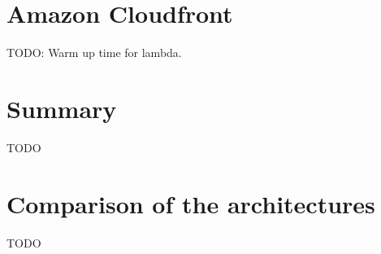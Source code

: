 














\section{Amazon Cloudfront}
TODO: Warm up time for lambda.
\section{Summary}
TODO

\section{Comparison of the architectures}
TODO